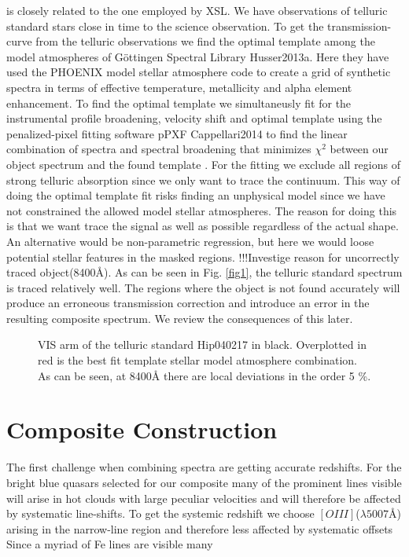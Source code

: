 \documentclass[iop]{emulateapj}
\begin{document}
is closely related to the one employed by XSL. We have observations of telluric standard stars close in time to the science observation. To get the transmission-curve from the telluric observations we find the optimal template among the model atmospheres of Göttingen Spectral Library Husser2013a. Here they have used the PHOENIX model stellar atmosphere code to create a grid of synthetic spectra in terms of effective temperature, metallicity and alpha element enhancement. To find the optimal template we simultaneusly fit for the instrumental profile broadening, velocity shift and optimal template using the penalized-pixel fitting software pPXF Cappellari2014 to find the linear combination of spectra and spectral broadening that minimizes $\chi ^2$ between our object spectrum and the found template . For the fitting we exclude all regions of strong telluric absorption since we only want to trace the continuum. This way of doing the optimal template fit risks finding an unphysical model since we have not constrained the allowed model stellar atmospheres. The reason for doing this is that we want trace the signal as well as possible regardless of the actual shape. An alternative would be non-parametric regression, but here we would loose potential stellar features in the masked regions. !!!Investige reason for uncorrectly traced object(8400\r{A}). As can be seen in Fig. \ref{fig1}, the telluric standard spectrum is traced relatively well. The regions where the object is not found accurately will produce an erroneous transmission correction and introduce an error in the resulting composite spectrum. We review the consequences of this later. 

\begin{figure}
\caption{VIS arm of the telluric standard Hip040217 in black. Overplotted in red is the best fit template stellar model atmosphere combination. As can be seen, at 8400\r{A}  there are local deviations in the order 5 \%.\label{fig2}}
\end{figure}


\section{Composite Construction}

The first challenge when combining spectra are getting accurate redshifts. For the bright blue quasars selected for our composite many of the prominent lines visible will arise in hot clouds with large peculiar velocities and will therefore be affected by systematic line-shifts. To get the systemic redshift we choose $[OIII]$($\lambda5007$\AA) arising in the narrow-line region and therefore less affected by systematic offsets   Since a myriad of Fe lines are visible many  
\end{document}
